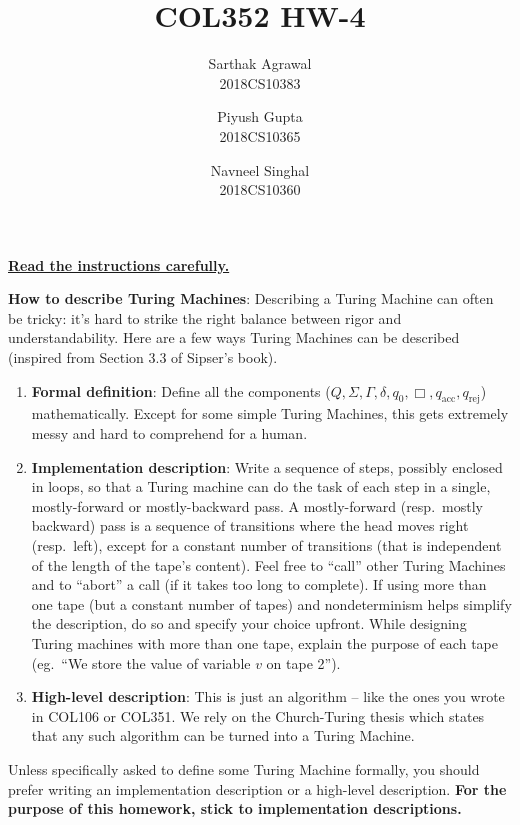 \documentclass[10pt,addpoints]{exam}
\title{COL352 HW-4}
\author{
Sarthak Agrawal \\ 2018CS10383
\and
Piyush Gupta \\ 2018CS10365
\and
Navneel Singhal \\ 2018CS10360
}
\begin{document}
\maketitle

\noindent\href{https://moodle.iitd.ac.in/mod/forum/discuss.php?d=19210#p26977}{\textbf{Read the instructions carefully.}}

\vspace{0.5cm}

\noindent\textbf{How to describe Turing Machines}: Describing a Turing Machine can often be tricky: it's hard to strike the right balance between rigor and understandability. Here are a few ways Turing Machines can be described (inspired from Section 3.3 of Sipser's book).

\begin{enumerate}
\item \textbf{Formal definition}: Define all the components ($Q,\Sigma,\Gamma,\delta,q_0,\Box,q_{\text{acc}},q_{\text{rej}}$) mathematically. Except for some simple Turing Machines, this gets extremely messy and hard to comprehend for a human.
\item \textbf{Implementation description}: Write a sequence of steps, possibly enclosed in loops, so that a Turing machine can do the task of each step in a single, mostly-forward or mostly-backward pass. A mostly-forward (resp.\ mostly backward) pass is a sequence of transitions where the head moves right (resp.\ left), except for a constant number of transitions (that is independent of the length of the tape's content). Feel free to ``call'' other Turing Machines and to ``abort'' a call (if it takes too long to complete). If using more than one tape (but a constant number of tapes) and nondeterminism helps simplify the description, do so and specify your choice upfront. While designing Turing machines with more than one tape, explain the purpose of each tape (eg.\ ``We store the value of variable $v$ on tape 2'').
\item \textbf{High-level description}: This is just an algorithm -- like the ones you wrote in COL106 or COL351. We rely on the Church-Turing thesis which states that any such algorithm can be turned into a Turing Machine.
\end{enumerate}

\noindent Unless specifically asked to define some Turing Machine formally, you should prefer writing an implementation description or a high-level description. \textbf{For the purpose of this homework, stick to implementation descriptions.}
\end{document}
